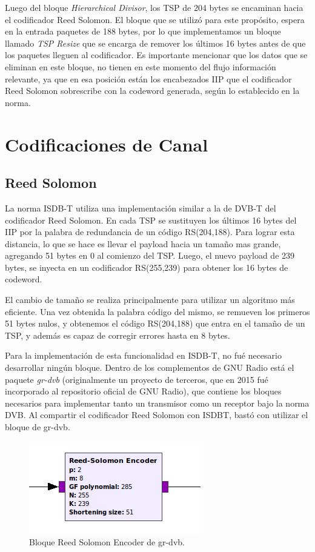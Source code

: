 Luego del bloque \textit{Hierarchical Divisor}, los TSP de 204 bytes se encaminan hacia el codificador Reed Solomon. El bloque que se utilizó para este propósito, espera en la entrada paquetes de 188 bytes, por lo que implementamos un bloque llamado \textit{TSP Resize} que se encarga de remover los últimos 16 bytes antes de que los paquetes lleguen al codificador. Es importante mencionar que los datos que se eliminan en este bloque, no tienen en este momento del flujo información relevante, ya que en esa posición están los encabezados IIP que el codificador Reed Solomon sobrescribe con la codeword generada, según lo establecido en la norma. 

\section{Codificaciones de Canal}

	\subsection{Reed Solomon}
La norma ISDB-T utiliza una implementación similar a la de DVB-T del codificador Reed Solomon. En cada TSP se sustituyen los últimos 16 bytes del IIP por la palabra de redundancia de un código RS(204,188). Para lograr esta distancia, lo que se hace es llevar el payload hacia un tamaño mas grande, agregando 51 bytes en 0 al comienzo del TSP. Luego, el nuevo payload de 239 bytes, se inyecta en un codificador RS(255,239) para obtener los 16 bytes de codeword. 

El cambio de tamaño se realiza principalmente para utilizar un algoritmo más eficiente. Una vez obtenida la palabra código del mismo, se remueven los primeros 51 bytes nulos, y obtenemos el código RS(204,188) que entra en el tamaño de un TSP, y además es capaz de corregir errores hasta en 8 bytes. 

Para la implementación de esta funcionalidad en ISDB-T, no fué necesario desarrollar ningún bloque. Dentro de los complementos de GNU Radio está el paquete \textit{gr-dvb}\cite{gr-dvb} (originalmente un proyecto de terceros, que en 2015 fué incorporado al repositorio oficial de GNU Radio), que contiene los bloques necesarios para implementar tanto un transmisor como un receptor bajo la norma DVB. Al compartir el codificador Reed Solomon con ISDBT, bastó con utilizar el bloque de gr-dvb.

\begin{figure}[h!]
	\centering
	\includegraphics[scale=0.5]{figuras/cap05/RSencoder}
	\caption{\label{f:RSencoder} Bloque Reed Solomon Encoder de gr-dvb.}
\end{figure}

